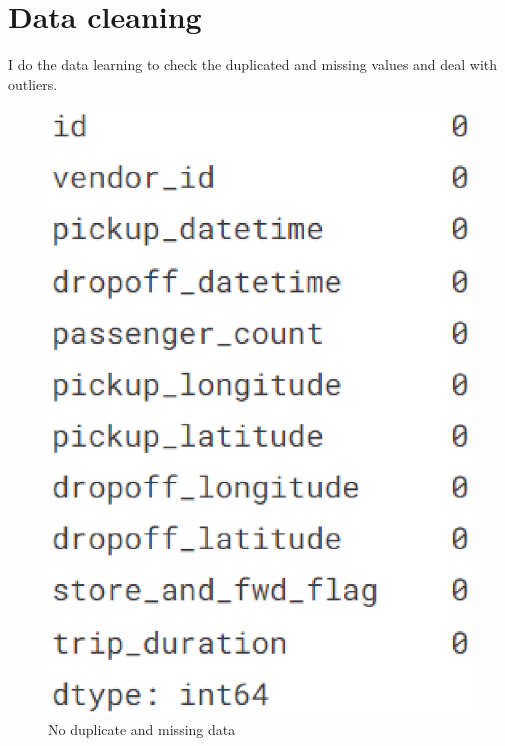 
\vspace{8cm}
\section{Data cleaning} \label{sec-Data cleaning}
I do the data learning to check the duplicated and missing values and deal with outliers.
\begin{figure}[h]
	\centering
	\includegraphics[scale=0.3]{duplicate.eps}
	\caption{No duplicate and missing data}
\end{figure}

